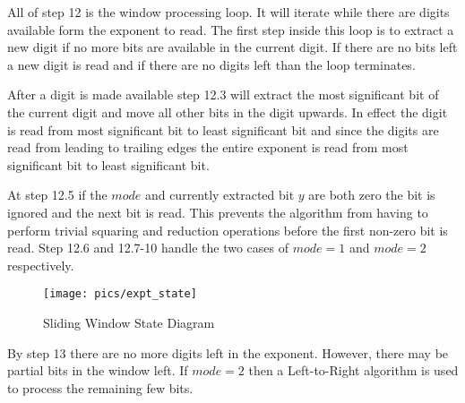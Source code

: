\documentclass[b5paper]{book}
\begin{document}
All of step 12 is the window processing loop.  It will iterate while there are digits available form the exponent to read.  The first step
inside this loop is to extract a new digit if no more bits are available in the current digit.  If there are no bits left a new digit is
read and if there are no digits left than the loop terminates.  

After a digit is made available step 12.3 will extract the most significant bit of the current digit and move all other bits in the digit
upwards.  In effect the digit is read from most significant bit to least significant bit and since the digits are read from leading to 
trailing edges the entire exponent is read from most significant bit to least significant bit.

At step 12.5 if the $mode$ and currently extracted bit $y$ are both zero the bit is ignored and the next bit is read.  This prevents the 
algorithm from having to perform trivial squaring and reduction operations before the first non-zero bit is read.  Step 12.6 and 12.7-10 handle
the two cases of $mode = 1$ and $mode = 2$ respectively.  

\begin{center}
\begin{figure}[here]
\texttt{[image: pics/expt\_state]}
\caption{Sliding Window State Diagram}
\end{figure}
\end{center}

By step 13 there are no more digits left in the exponent.  However, there may be partial bits in the window left.  If $mode = 2$ then 
a Left-to-Right algorithm is used to process the remaining few bits.  
\end{document}
